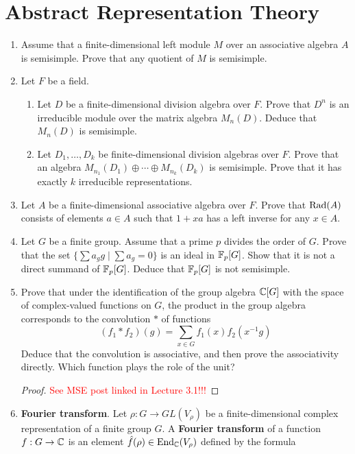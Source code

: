 \documentclass[../psets.tex]{subfiles}
\begin{document}
\section{Abstract Representation Theory}
\begin{enumerate}
    \item {}Assume that a finite-dimensional left module $M$ over an associative algebra $A$ is semisimple. Prove that any quotient of $M$ is semisimple.
    \item Let $F$ be a field.
    \begin{enumerate}
        \item Let $D$ be a finite-dimensional division algebra over $F$. Prove that $D^n$ is an irreducible module over the matrix algebra $M_n(D)$. Deduce that $M_n(D)$ is semisimple.
        \item Let $D_1,\dots,D_k$ be finite-dimensional division algebras over $F$. Prove that an algebra $M_{n_1}(D_1)\oplus\cdots\oplus M_{n_k}(D_k)$ is semisimple. Prove that it has exactly $k$ irreducible representations.
    \end{enumerate}
    \item Let $A$ be a finite-dimensional associative algebra over $F$. Prove that $\operatorname{Rad}(A)$ consists of elements $a\in A$ such that $1+xa$ has a left inverse for any $x\in A$.
    \item Let $G$ be a finite group. Assume that a prime $p$ divides the order of $G$. Prove that the set $\{\sum a_gg\mid\sum a_g=0\}$ is an ideal in $\mathbb{F}_p[G]$. Show that it is not a direct summand of $\mathbb{F}_p[G]$. Deduce that $\mathbb{F}_p[G]$ is not semisimple.
    \item Prove that under the identification of the group algebra $\mathbb{C}[G]$ with the space of complex-valued functions on $G$, the product in the group algebra corresponds to the convolution $*$ of functions
    \begin{equation*}
        (f_1*f_2)(g) = \sum_{x\in G}f_1(x)f_2(x^{-1}g)
    \end{equation*}
    Deduce that the convolution is associative, and then prove the associativity directly. Which function plays the role of the unit?
    \begin{proof}
        \textcolor{red}{See MSE post linked in Lecture 3.1!!!}
    \end{proof}
    \item \textbf{Fourier transform}. Let $\rho:G\to GL(V_\rho)$ be a finite-dimensional complex representation of a finite group $G$. A \textbf{Fourier transform} of a function $f:G\to\mathbb{C}$ is an element $\hat{f}(\rho)\in\operatorname{End}_{\mathbb{C}}(V_\rho)$ defined by the formula

\end{enumerate}
\end{document}
